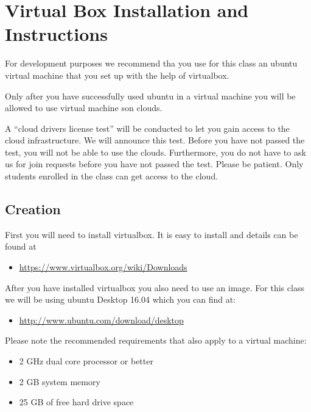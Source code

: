 \FILENAME

\section{Virtual Box Installation and
Instructions}\label{virtual-box-installation-and-instructions}

For development purposes we recommend tha you use for this class an
ubuntu virtual machine that you set up with the help of virtualbox.

Only after you have successfully used ubuntu in a virtual machine you
will be allowed to use virtual machine son clouds.

A ``cloud drivers license test'' will be conducted to let you gain
access to the cloud infrastructure. We will announce this test. Before
you have not passed the test, you will not be able to use the clouds.
Furthermore, you do not have to ask us for join requests before you have
not passed the test. Please be patient. Only students enrolled in the
class can get access to the cloud.

\subsection{Creation}\label{creation}

First you will need to install virtualbox. It is easy to install and
details can be found at

\begin{itemize}
\tightlist
\item
  \url{https://www.virtualbox.org/wiki/Downloads}
\end{itemize}

After you have installed virtualbox you also need to use an image. For
this class we will be using ubuntu Desktop 16.04 which you can find at:

\begin{itemize}
\tightlist
\item
  \url{http://www.ubuntu.com/download/desktop}
\end{itemize}

Please note the recommended requirements that also apply to a virtual
machine:

\begin{itemize}
\tightlist
\item
  2 GHz dual core processor or better
\item
  2 GB system memory
\item
  25 GB of free hard drive space
\end{itemize}

